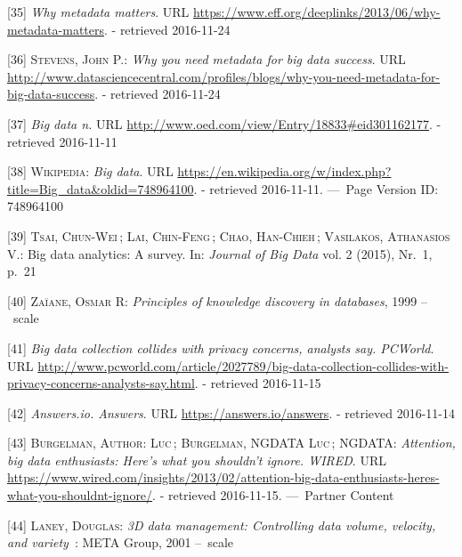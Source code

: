 \documentclass[12pt,english,a4paper,titlepage,cleardoublepage=empty,dottedtoc]{report}
\begin{document}
\hypertarget{ref-web_2013_why-metadata-matters}{}
{[}35{]} \emph{Why metadata matters}. URL
\url{https://www.eff.org/deeplinks/2013/06/why-metadata-matters}. -
retrieved 2016-11-24

\hypertarget{ref-web_2016_why-you-need-metadata-for-big-data-to-success}{}
{[}36{]} \textsc{Stevens, John P.}: \emph{Why you need metadata for big
data success}. URL
\url{http://www.datasciencecentral.com/profiles/blogs/why-you-need-metadata-for-big-data-success}.
- retrieved 2016-11-24

\hypertarget{ref-web_2016_oxford_definition_big-data}{}
{[}37{]} \emph{Big data n.} URL
\url{http://www.oed.com/view/Entry/18833\#eid301162177}. - retrieved
2016-11-11

\hypertarget{ref-web_2016_wikipedia_definition_big-data}{}
{[}38{]} \textsc{Wikipedia}: \emph{Big data}. URL
\url{https://en.wikipedia.org/w/index.php?title=Big_data\&oldid=748964100}.
- retrieved 2016-11-11. ---~Page Version ID: 748964100

\hypertarget{ref-paper_2015_big-data-analytics_a-survey}{}
{[}39{]} \textsc{Tsai, Chun-Wei}\,; \textsc{Lai, Chin-Feng}\,;
\textsc{Chao, Han-Chieh}\,; \textsc{Vasilakos, Athanasios V.}: Big data
analytics: A survey. In: \emph{Journal of Big Data} vol. 2 (2015),
Nr.~1, p.~21

\hypertarget{ref-book-chapter_1999_Principles-of-knowledge-discovery-in-databases_introduction-to-data-mining}{}
{[}40{]} \textsc{Zaïane, Osmar R}: \emph{Principles of knowledge
discovery in databases}, 1999 --~scale

\hypertarget{ref-web_2013_big-data-collection-collides-with-privacy-concerns}{}
{[}41{]} \emph{Big data collection collides with privacy concerns,
analysts say. PCWorld}. URL
\url{http://www.pcworld.com/article/2027789/big-data-collection-collides-with-privacy-concerns-analysts-say.html}.
- retrieved 2016-11-15

\hypertarget{ref-web_2016_answers-io}{}
{[}42{]} \emph{Answers.io. Answers}. URL
\url{https://answers.io/answers}. - retrieved 2016-11-14

\hypertarget{ref-web_2016_big-data-enthusiasts-should-not-ignore}{}
{[}43{]} \textsc{Burgelman, Author: Luc}\,; \textsc{Burgelman, NGDATA
Luc}\,; \textsc{NGDATA}: \emph{Attention, big data enthusiasts: Here's
what you shouldn't ignore. WIRED}. URL
\url{https://www.wired.com/insights/2013/02/attention-big-data-enthusiasts-heres-what-you-shouldnt-ignore/}.
- retrieved 2016-11-15. ---~Partner Content

\hypertarget{ref-report_2001_3d-data-management-controlling-data-volume-velocity-and-variety}{}
{[}44{]} \textsc{Laney, Douglas}: \emph{3D data management: Controlling
data volume, velocity, and variety}~: META Group, 2001 --~scale
\end{document}
